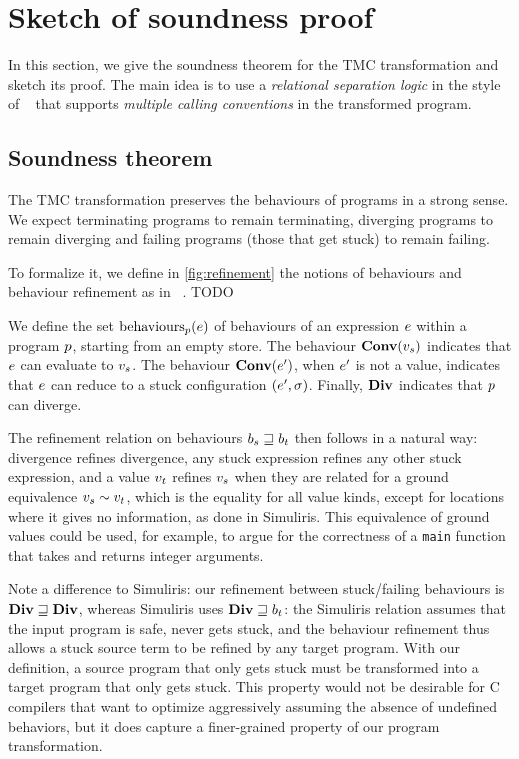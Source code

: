 \section{Sketch of soundness proof}
\label{sec:sketch}

In this section, we give the soundness theorem for the \DataLang TMC transformation and sketch its proof.
The main idea is to use a \emph{relational separation logic} in the style of \Simuliris~\cite{DBLP:journals/pacmpl/GaherSSJDKKD22} that supports \emph{multiple calling conventions} in the transformed program.

\subsection{Soundness theorem}

The TMC transformation preserves the behaviours of programs in a strong sense.
We expect terminating programs to remain terminating, diverging programs to remain diverging and failing programs (those that get stuck) to remain failing.

To formalize it, we define in \cref{fig:refinement} the notions of behaviours and behaviour refinement as in \Simuliris~\cite{DBLP:journals/pacmpl/GaherSSJDKKD22}.
TODO

We define the set $\mathrm{behaviours}_{\datalangProg} (\datalangExpr)$ of behaviours of an expression $\datalangExpr$ within a program $\datalangProg$, starting from an empty store.
The behaviour $\constr{Conv}(\datalangVal_s)$ indicates that $\datalangExpr$ can evaluate to $\datalangVal_s$.
The behaviour $\constr{Conv}(\datalangExpr')$, when $\datalangExpr'$ is not a value, indicates that $\datalangExpr$ can reduce to a stuck configuration $(\datalangExpr', \datalangState)$.
Finally, $\constr{Div}$ indicates that $\datalangProg$ can diverge.

The refinement relation on behaviours $b_s \sqsupseteq b_t$ then follows in a natural way: divergence refines divergence, any stuck expression refines any other stuck expression, and a value $\datalangVal_t$ refines $\datalangVal_s$ when they are related for a ground equivalence $\datalangVal_s \similar \datalangVal_t$, which is the equality for all value kinds, except for locations where it gives no information, as done in Simuliris.
This equivalence of ground values could be used, for example, to argue for the correctness of a \texttt{main} function that takes and returns integer arguments.

Note a difference to Simuliris: our refinement between stuck/failing behaviours is $\constr{Div} \refined \constr{Div}$, whereas Simuliris uses $\constr{Div} \refined b_t$: the Simuliris relation assumes that the input program is safe, never gets stuck, and the behaviour refinement thus allows a stuck source term to be refined by any target program. With our definition, a source program that only gets stuck must be transformed into a target program that only gets stuck.
This property would not be desirable for C compilers that want to optimize aggressively assuming the absence of undefined behaviors, but it does capture a finer-grained property of our program transformation.

